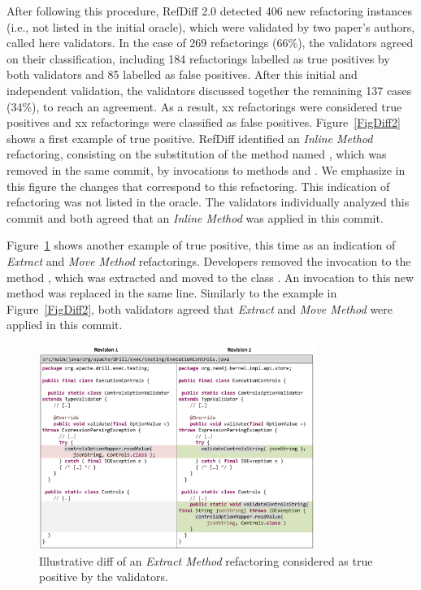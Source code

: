 After following this procedure, RefDiff 2.0 detected 406 new refactoring instances (i.e., not listed in the initial oracle), which were  validated by two paper's authors, called here validators.  In the case of 269 refactorings (66\%), the validators agreed on their classification, including 184 refactorings labelled as true positives by both validators and 85 labelled as false positives. After this initial and independent validation, the validators discussed together the remaining 137 cases (34\%), to reach an agreement. As a result, xx refactorings were considered true positives and xx refactorings were classified as false positives. Figure~\ref{FigDiff2} shows a first example of true positive. RefDiff identified an \emph{Inline Method} refactoring, consisting on the substitution of the method named , which was removed in the same commit, by invocations to methods  and . We emphasize in this figure the changes that correspond to this refactoring. This indication of refactoring was not listed in the oracle. The validators individually analyzed this commit and both agreed that an \emph{Inline Method} was applied in this commit.



Figure~\ref{FigDiff3} shows another example of true positive, this time as an indication of \emph{Extract} and \emph{Move Method} refactorings. Developers removed the invocation to the method , which was extracted and moved to the class . An invocation to this new method  was replaced in the same line. Similarly to the example in Figure~\ref{FigDiff2}, both validators agreed that \emph{Extract} and \emph{Move Method} were applied in this commit.

\begin{figure}[htb]
\centering
\includegraphics[width=0.8\textwidth]{img/diff3.pdf}
\caption{Illustrative diff of an \emph{Extract Method} refactoring considered as true positive by the validators.}
\label{FigDiff3}
\end{figure}

